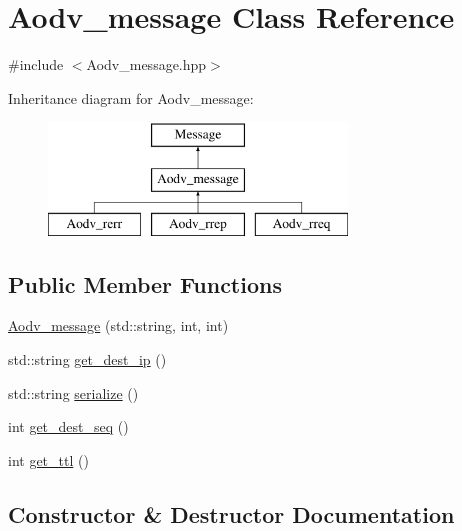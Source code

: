 \hypertarget{class_aodv__message}{}\section{Aodv\+\_\+message Class Reference}
\label{class_aodv__message}


{\ttfamily \#include $<$Aodv\+\_\+message.\+hpp$>$}

Inheritance diagram for Aodv\+\_\+message\+:\begin{figure}[H]
\begin{center}
\leavevmode
\includegraphics[height=3.000000cm]{class_aodv__message}
\end{center}
\end{figure}
\subsection*{Public Member Functions}
\begin{DoxyCompactItemize}
\item 
\hyperlink{class_aodv__message_a0a2b1d41e31790c8c7ee6b1f4696d111}{Aodv\+\_\+message} (std\+::string, int, int)
\item 
std\+::string \hyperlink{class_aodv__message_ae3237227c6cfe4ef060954b9ee8583ba}{get\+\_\+dest\+\_\+ip} ()
\item 
std\+::string \hyperlink{class_aodv__message_ad781f3f00c64bc2f1f9767d2a1154af3}{serialize} ()
\item 
int \hyperlink{class_aodv__message_a492730e2bac77ae381c5a3b50f6fe7c5}{get\+\_\+dest\+\_\+seq} ()
\item 
int \hyperlink{class_aodv__message_aebdbe5f76bb29cb30d2bb5d739644485}{get\+\_\+ttl} ()
\end{DoxyCompactItemize}


\subsection{Constructor \& Destructor Documentation}
